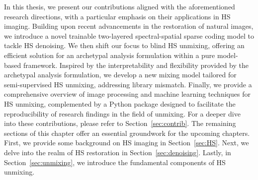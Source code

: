 In this thesis, we present our contributions aligned with the aforementioned research directions, with a particular emphasis on their applications in HS imaging.
Building upon recent advancements in the restoration of natural images, we introduce a novel trainable two-layered spectral-spatial sparse coding model to tackle HS denoising.
We then shift our focus to blind HS unmixing, offering an efficient solution for an archetypal analysis formulation within a pure model-based framework.
Inspired by the interpretability and flexibility provided by the archetypal analysis formulation, we develop a new mixing model tailored for semi-supervised HS unmixing, addressing library mismatch.
Finally, we provide a comprehensive overview of image processing and machine learning techniques for HS unmixing, complemented by a Python package designed to facilitate the reproducibility of research findings in the field of unmixing.
For a deeper dive into these contributions, please refer to Section~\ref{sec:contrib}.
The remaining sections of this chapter offer an essential groundwork for the upcoming chapters.
First, we provide some background on HS imaging in Section~\ref{sec:HS}.
Next, we delve into the realm of HS restoration in Section~\ref{sec:denoising}.
Lastly, in Section~\ref{sec:unmixing}, we introduce the fundamental components of HS unmixing.





